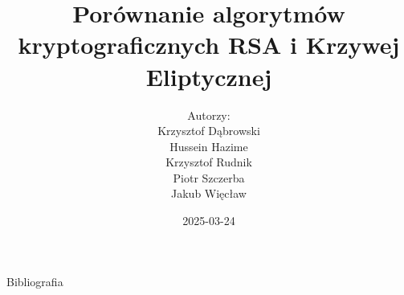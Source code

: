 \documentclass{beamer}
\title{Porównanie algorytmów kryptograficznych RSA i Krzywej Eliptycznej}
\author{Autorzy:\\ Krzysztof Dąbrowski\\ Hussein Hazime\\ Krzysztof Rudnik\\ Piotr Szczerba\\ Jakub Więcław}
\date{2025-03-24}
\begin{document}
\begin{frame}
    \titlepage
\end{frame}













\begin{frame}{Bibliografia}
\printbibliography
\end{frame}
\end{document}
